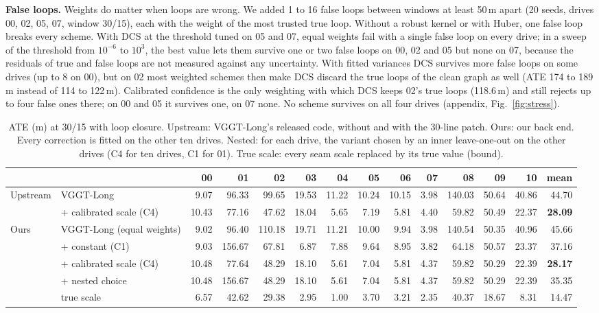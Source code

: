 \documentclass[conference]{IEEEtran}
\begin{document}
\textbf{False loops.} Weights do matter when loops are wrong. We added 1 to 16 false loops between windows at least 50\,m
apart (20 seeds, drives 00, 02, 05, 07, window 30/15), each with the weight of the most trusted true loop. Without a robust kernel or
with Huber, one false loop breaks every scheme. With DCS at the threshold tuned on 05 and 07, equal weights fail with a
single false loop on every drive; in a sweep of the threshold from $10^{-6}$ to $10^3$, the best value lets them survive
one or two false loops on 00, 02 and 05 but none on 07, because the residuals of true and false loops are not measured
against any uncertainty. With fitted variances DCS survives more false loops on some drives (up to 8 on 00), but on 02
most weighted schemes then make DCS discard the true loops of the clean graph as well (ATE 174 to 189\,m instead of 114
to 122\,m). Calibrated confidence is the only weighting with which DCS keeps 02's true loops (118.6\,m) and still
rejects up to four false ones there; on 00 and 05 it survives one, on 07 none. No scheme survives on all four drives
(appendix, Fig.~\ref{fig:stress}).



\begin{table}[t]
\centering
\caption{ATE (m) at 30/15 with loop closure. Upstream: VGGT-Long's released code, without and with the 30-line patch.
Ours: our back end. Every correction is fitted on the other ten drives. Nested: for each drive, the variant chosen by an
inner leave-one-out on the other drives (C4 for ten drives, C1 for 01). True scale: every seam scale replaced by its
true value (bound).}
\label{tab:main}
\footnotesize
\begin{tabular}{llrrrrrrrrrrrr}
\toprule
& & 00 & 01 & 02 & 03 & 04 & 05 & 06 & 07 & 08 & 09 & 10 & mean \\
\midrule
\multirow{2}{*}{Upstream} & VGGT-Long & 9.07 & 96.33 & 99.65 & 19.53 & 11.22 & 10.24 & 10.15 & 3.98 & 140.03 & 50.64 & 40.86 & 44.70 \\
& + calibrated scale (C4) & 10.43 & 77.16 & 47.62 & 18.04 & 5.65 & 7.19 & 5.81 & 4.40 & 59.82 & 50.49 & 22.37 & \textbf{28.09} \\
\midrule
\multirow{5}{*}{Ours} & VGGT-Long (equal weights) & 9.02 & 96.40 & 110.18 & 19.71 & 11.21 & 10.00 & 9.94 & 3.98 & 140.54 & 50.35 & 40.96 & 45.66 \\
& + constant (C1) & 9.03 & 156.67 & 67.81 & 6.87 & 7.88 & 9.64 & 8.95 & 3.82 & 64.18 & 50.57 & 23.37 & 37.16 \\
& + calibrated scale (C4) & 10.48 & 77.64 & 48.29 & 18.10 & 5.61 & 7.04 & 5.81 & 4.37 & 59.82 & 50.29 & 22.39 & \textbf{28.17} \\
& + nested choice & 10.48 & 156.67 & 48.29 & 18.10 & 5.61 & 7.04 & 5.81 & 4.37 & 59.82 & 50.29 & 22.39 & 35.35 \\
& true scale & 6.57 & 42.62 & 29.38 & 2.95 & 1.00 & 3.70 & 3.21 & 2.35 & 40.37 & 18.67 & 8.31 & 14.47 \\
\bottomrule
\end{tabular}
\end{table}
\end{document}

